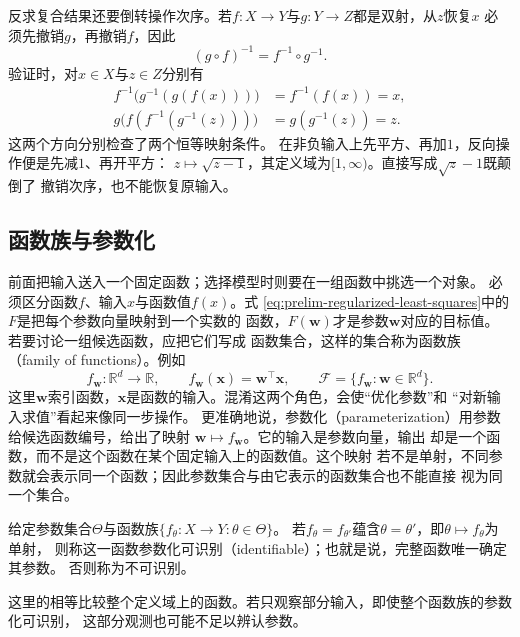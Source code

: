 反求复合结果还要倒转操作次序。若$f:X\to Y$与$g:Y\to Z$都是双射，从$z$恢复$x$
必须先撤销$g$，再撤销$f$，因此
\begin{equation}
  (g\circ f)^{-1}=f^{-1}\circ g^{-1}.
  \label{eq:prelim-inverse-composition}
\end{equation}
验证时，对$x\in X$与$z\in Z$分别有
\[
  \begin{aligned}
    f^{-1}\bigl(g^{-1}(g(f(x)))\bigr)&=f^{-1}(f(x))=x,\\
    g\bigl(f(f^{-1}(g^{-1}(z)))\bigr)&=g(g^{-1}(z))=z.
  \end{aligned}
\]
这两个方向分别检查了两个恒等映射条件。
在非负输入上先平方、再加$1$，反向操作便是先减$1$、再开平方：
$z\mapsto\sqrt{z-1}$，其定义域为$[1,\infty)$。直接写成$\sqrt z-1$既颠倒了
撤销次序，也不能恢复原输入。

\subsection{函数族与参数化}
\label{sec:prelim-function-families}

前面把输入送入一个固定函数；选择模型时则要在一组函数中挑选一个对象。
必须区分函数$f$、输入$x$与函数值$f(x)$。式
\eqref{eq:prelim-regularized-least-squares}中的$F$是把每个参数向量映射到一个实数的
函数，$F(\bm{w})$才是参数$\bm{w}$对应的目标值。若要讨论一组候选函数，应把它们写成
函数集合，这样的集合称为函数族（family of functions）。例如
\[
  f_{\bm{w}}:\mathbb{R}^d\to\mathbb{R},
  \qquad
  f_{\bm{w}}(\bm{x})=\bm{w}^{\top}\bm{x},
  \qquad
  \mathcal{F}=\{f_{\bm{w}}:\bm{w}\in\mathbb{R}^d\}.
\]
这里$\bm{w}$索引函数，$\bm{x}$是函数的输入。混淆这两个角色，会使“优化参数”和
“对新输入求值”看起来像同一步操作。
更准确地说，参数化（parameterization）用参数给候选函数编号，给出了映射
$\bm{w}\mapsto f_{\bm{w}}$。它的输入是参数向量，输出
却是一个函数，而不是这个函数在某个固定输入上的函数值。这个映射
若不是单射，不同参数就会表示同一个函数；因此参数集合与由它表示的函数集合也不能直接
视为同一个集合。

\begin{definition}[函数参数化的可识别性]
\label{def:prelim-identifiable-parameterization}
给定参数集合$\Theta$与函数族$\{f_\theta:X\to Y:\theta\in\Theta\}$。
若$f_\theta=f_{\theta'}$蕴含$\theta=\theta'$，即$\theta\mapsto f_\theta$为单射，
则称这一函数参数化可识别（identifiable）；也就是说，完整函数唯一确定其参数。
否则称为不可识别。
\end{definition}
这里的相等比较整个定义域上的函数。若只观察部分输入，即使整个函数族的参数化可识别，
这部分观测也可能不足以辨认参数。


